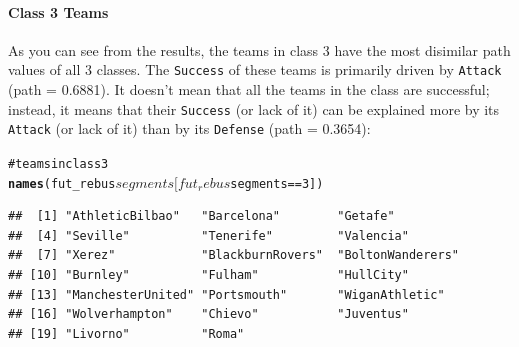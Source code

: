 \documentclass[12pt]{book}\usepackage{graphicx, color}
\makeatletter
\newcommand{\hlfunctioncall}[1]{\textcolor[rgb]{0.501960784313725,0,0.329411764705882}{\textbf{#1}}}%
\newcommand{\hlcomment}[1]{\textcolor[rgb]{0.180392156862745,0.6,0.341176470588235}{#1}}%
\newenvironment{kframe}{%
 \def\at@end@of@kframe{}%
 \ifinner\ifhmode%
  \def\at@end@of@kframe{\end{minipage}}%
  \begin{minipage}{\columnwidth}%
 \fi\fi%
 \def\FrameCommand##1{\hskip\@totalleftmargin \hskip-\fboxsep
 \colorbox{shadecolor}{##1}\hskip-\fboxsep
     \hskip-\linewidth \hskip-\@totalleftmargin \hskip\columnwidth}%
 \MakeFramed {\advance\hsize-\width
   \@totalleftmargin\z@ \linewidth\hsize
   \@setminipage}}%
 {\par\unskip\endMakeFramed%
 \at@end@of@kframe}
\newenvironment{knitrout}{}{} %
\newcommand{\code}[1]{\texttt{#1}}
\makeatother
\begin{document}
\paragraph{Class 3 Teams} As you can see from the results, the teams in class 3 have the most disimilar path values of all 3 classes. The \code{Success} of these teams is primarily driven by \code{Attack} (path = 0.6881). It doesn't mean that all the teams in the class are successful; instead, it means that their \code{Success} (or lack of it) can be explained more by its \code{Attack} (or lack of it) than by its \code{Defense} (path = 0.3654):
\begin{knitrout}
\color{fgcolor}\begin{kframe}
\begin{alltt}
\hlcomment{# teams in class 3}
\hlfunctioncall{names}(fut_rebus$segments[fut_rebus$segments == 3])
\end{alltt}
\begin{verbatim}
##  [1] "AthleticBilbao"   "Barcelona"        "Getafe"          
##  [4] "Seville"          "Tenerife"         "Valencia"        
##  [7] "Xerez"            "BlackburnRovers"  "BoltonWanderers" 
## [10] "Burnley"          "Fulham"           "HullCity"        
## [13] "ManchesterUnited" "Portsmouth"       "WiganAthletic"   
## [16] "Wolverhampton"    "Chievo"           "Juventus"        
## [19] "Livorno"          "Roma"
\end{verbatim}
\end{kframe}
\end{knitrout}
\end{document}
